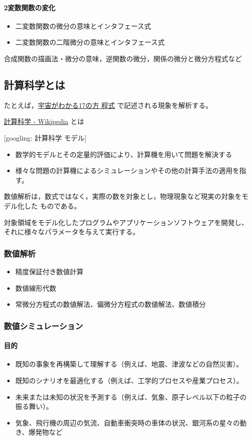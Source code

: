 \documentclass[dvipdfmx,11pat]{jarticle}
\begin{document}
\paragraph{2変数関数の変化}
\label{sec:org6182828}
\begin{itemize}
\item 二変数関数の微分の意味とインタフェース式
\item 二変数関数の二階微分の意味とインタフェース式
\end{itemize}

合成関数の描画法・微分の意味，逆関数の微分，関係の微分と微分方程式など
\subsection{計算科学とは}
\label{sec:orgb818360}

たとえば，\href{topics/宇宙がわかる17の方程式.org}{宇宙がわかる17の方
程式} で記述される現象を解析する。

\href{https://ja.wikipedia.org/wiki/\%E8\%A8\%88\%E7\%AE\%97\%E7\%A7\%91\%E5\%AD\%A6}{計算科学 - Wikipedia} とは

{[}googling: 計算科学 モデル] 
\begin{itemize}
\item 数学的モデルとその定量的評価により、計算機を用いて問題を解決する
\item 様々な問題の計算機によるシミュレーションやその他の計算手法の適用を指
す。
\end{itemize}

数値解析は，数式ではなく，実際の数を対象とし，物理現象など現実の対象をモデル化した
ものである。

対象領域をモデル化したプログラムやアプリケーションソフトウェアを開発し、
それに様々なパラメータを与えて実行する。
\subsubsection{数値解析}
\label{sec:org10cd1d8}
\begin{itemize}
\item 精度保証付き数値計算
\item 数値線形代数
\item 常微分方程式の数値解法、偏微分方程式の数値解法、数値積分
\end{itemize}
\subsubsection{数値シミュレーション}
\label{sec:org142935b}
\paragraph{目的}
\label{sec:org607009a}
\begin{itemize}
\item 既知の事象を再構築して理解する（例えば、地震、津波などの自然災害）。
\item 既知のシナリオを最適化する（例えば、工学的プロセスや産業プロセス）。
\item 未来または未知の状況を予測する（例えば、気象、原子レベル以下の粒子の振る舞い）。
\item 気象、飛行機の周辺の気流、自動車衝突時の車体の状況、銀河系の星々の動き、爆発物など
\end{itemize}
\end{document}
